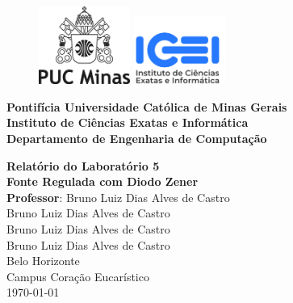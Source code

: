 \thispagestyle{empty} %

\begin{figure}[t]
    \includegraphics[width=3cm]{images/logo-puc-minas.png}
    \hspace{0.02\textwidth}
    \vline%
    \hspace{0.04\textwidth}
    \includegraphics[width=3cm]{images/logo-icei.jpeg}
\end{figure}

\hrulefill%
\vspace{\baselineskip}

\Large\noindent
\textbf{Pontifícia Universidade Católica de Minas Gerais} \\
\textbf{Instituto de Ciências Exatas e Informática} \\
\textbf{Departamento de Engenharia de Computação}

\begin{center}
    \vfill
    \Huge\textbf{Relatório do Laboratório 5} \\
    \vspace{0.5cm}
    \Large\textbf{Fonte Regulada com Diodo Zener} \\
    \vspace{1cm}
    \large \textbf{Professor}: Bruno Luiz Dias Alves de Castro \\
    \vspace{0.5cm}
    \large Bruno Luiz Dias Alves de Castro \\
    \large Bruno Luiz Dias Alves de Castro \\
    \large Bruno Luiz Dias Alves de Castro \\
    \vfill
    \large Belo Horizonte \\ Campus Coração Eucarístico \\
    \vspace{\baselineskip}
    \large \today
\end{center}